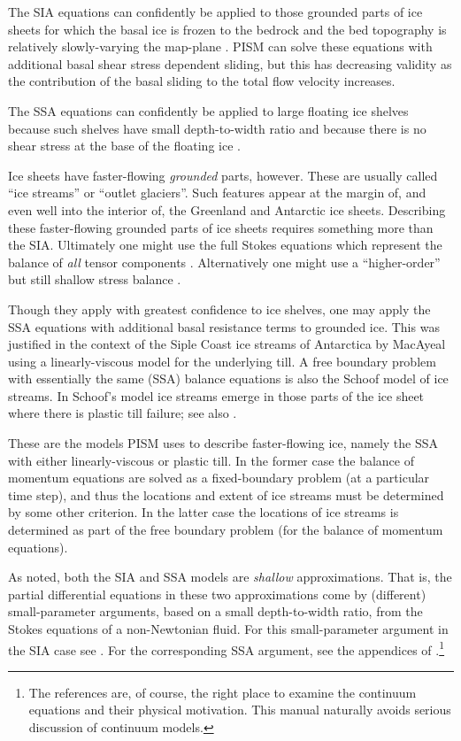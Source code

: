 \documentclass[11pt,final]{amsart}
\begin{document}
The SIA equations can confidently be applied to those grounded parts of ice sheets for which the basal ice is frozen to the bedrock and the bed topography is relatively slowly-varying the map-plane \cite{Fowler}.  PISM can solve these equations with additional basal shear stress dependent sliding, but this has decreasing validity as the contribution of the basal sliding to the total flow velocity increases.

The SSA equations can confidently be applied to large floating ice shelves because such shelves have small depth-to-width ratio and because there is no shear stress at the base of the floating ice \cite{Morland,MorlandZainuddin}.

Ice sheets have faster-flowing \emph{grounded} parts, however.  These are usually called ``ice streams'' or ``outlet glaciers''.  Such features appear at the margin of, and even well into the interior of, the Greenland \cite{Joughinetal2001} and Antarctic \cite{BamberVaughanJoughin} ice sheets.  Describing these faster-flowing grounded parts of ice sheets requires something more than the SIA.  Ultimately one might use the full Stokes equations which represent the balance of \emph{all} tensor components \cite{Fowler}.  Alternatively one might use a ``higher-order'' but still shallow stress balance \cite{Blatter}.

Though they apply with greatest confidence to ice shelves, one may apply the SSA equations with additional basal resistance terms to grounded ice.  This was justified in the context of the Siple Coast ice streams of Antarctica by MacAyeal \cite{MacAyeal,HulbeMacAyeal} using a linearly-viscous model for the underlying till.  A free boundary problem with essentially the same (SSA) balance equations is also the Schoof \cite{SchoofStream} model of ice streams.  In Schoof's model ice streams emerge in those parts of the ice sheet where there is plastic till failure; see also \cite{SchoofTill}.

These are the models PISM uses to describe faster-flowing ice, namely the SSA with either linearly-viscous or plastic till.  In the former case the balance of momentum equations are solved as a fixed-boundary problem (at a particular time step), and thus the locations and extent of ice streams must be determined by some other criterion.  In the latter case the locations of ice streams is determined as part of the free boundary problem (for the balance of momentum equations).

As noted, both the SIA and SSA models are \emph{shallow} approximations.  That is, the partial differential equations in these two approximations come by (different) small-parameter arguments, based on a small depth-to-width ratio, from the Stokes equations of a non-Newtonian fluid.  For this small-parameter argument in the SIA case see \cite{Fowler}.  For the corresponding SSA argument, see the appendices of \cite{SchoofStream}.\footnote{The references are, of course, the right place to examine the continuum equations and their physical motivation.  This manual naturally avoids serious discussion of continuum models.}
\end{document}

